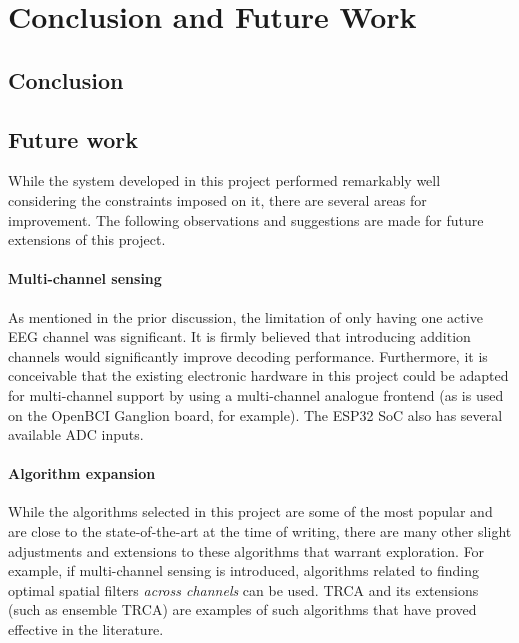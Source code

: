 \chapter{Conclusion and Future Work}
\label{chapter:conclusion}

\section{Conclusion}

\section{Future work}
While the system developed in this project performed remarkably well considering the constraints imposed on it, there are several areas for improvement. The following observations and suggestions are made for future extensions of this project. 

\subsubsection{Multi-channel sensing}
As mentioned in the prior discussion, the limitation of only having one active EEG channel was significant. It is firmly believed that introducing addition channels would significantly improve decoding performance. Furthermore, it is conceivable that the existing electronic hardware in this project could be adapted for multi-channel support by using a multi-channel analogue frontend (as is used on the OpenBCI Ganglion board, for example). The ESP32 SoC also has several available ADC inputs.

\subsubsection{Algorithm expansion}
While the algorithms selected in this project are some of the most popular and are close to the state-of-the-art at the time of writing, there are many other slight adjustments and extensions to these algorithms that warrant exploration. For example, if multi-channel sensing is introduced, algorithms related to finding optimal spatial filters \textit{across channels} can be used. TRCA and its extensions (such as ensemble TRCA) are examples of such algorithms that have proved effective in the literature. 

